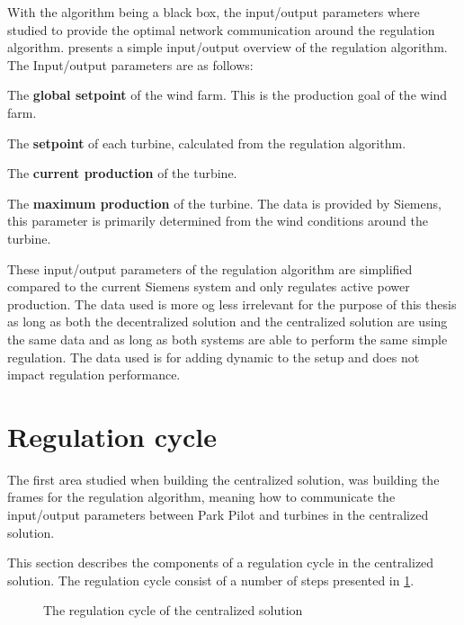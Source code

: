 With the algorithm being a black box, the input/output parameters where studied to provide the optimal network communication around the regulation algorithm.  presents a simple input/output overview of the regulation algorithm. The Input/output parameters are as follows:

\begin{description}
	\item The \textbf{global setpoint} of the wind farm. This is the production goal of the wind farm. %
	\item The \textbf{setpoint} of each turbine, calculated from the regulation algorithm. 
	\item The \textbf{current production} of the turbine.
	\item The \textbf{maximum production} of the turbine. The data is provided by Siemens, this parameter is primarily determined from the wind conditions around the turbine.
\end{description}

These input/output parameters of the regulation algorithm are simplified compared to the current Siemens system and only regulates active power production. The data used is more og less irrelevant for the purpose of this thesis as long as both the decentralized solution and the centralized solution are using the same data and as long as both systems are able to perform the same simple regulation.
The data used is for adding dynamic to the setup and does not impact regulation performance.

\section{Regulation cycle}\label{sec:currentSystemCen} 

The first area studied when building the centralized solution, was building the frames for the regulation algorithm, meaning how to communicate the input/output parameters between Park Pilot and turbines in the centralized solution.

This section describes the components of a regulation cycle in the centralized solution. The regulation cycle consist of a number of steps presented in \cref{fig:timingCentral}.

\begin{figure}[!h]
	
	\caption{The regulation cycle of the centralized solution}
	\label{fig:timingCentral}
\end{figure}


